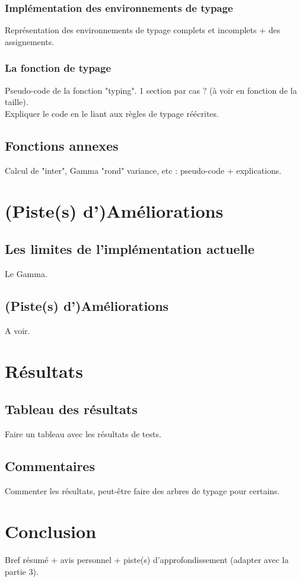 \documentclass[11pt,a4paper]{article}
\begin{document}
\subsubsection{Implémentation des environnements de typage}

Représentation des environnements de typage complets et incomplets + des assignements. 

\subsubsection{La fonction de typage}

Pseudo-code de la fonction "typing". 
1 section par cas ? (à voir en fonction de la taille).
\\
Expliquer le code en le liant aux règles de typage réécrites. 

\subsection{Fonctions annexes}

Calcul de "inter", Gamma "rond" variance, etc : pseudo-code + explications.

\section{(Piste(s) d')Améliorations}

\subsection{Les limites de l'implémentation actuelle}

Le Gamma. 

\subsection{(Piste(s) d')Améliorations}

A voir.

\section{Résultats}

\subsection{Tableau des résultats}

Faire un tableau avec les résultats de tests.

\subsection{Commentaires}

Commenter les résultats, peut-être faire des arbres de typage pour certains.

\section*{Conclusion}

Bref résumé + avis personnel + piste(s) d'approfondissement (adapter avec la partie 3).




\end{document}

